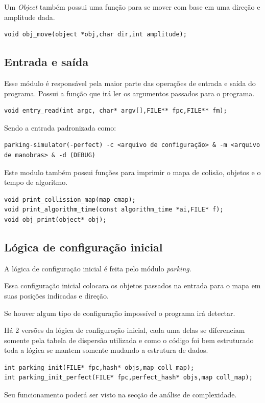 \documentclass[11pt]{article}
\begin{document}
Um \emph{Object} também possui uma função para se mover com base em uma direção e amplitude dada.

\begin{verbatim}
void obj_move(object *obj,char dir,int amplitude);
\end{verbatim}

\subsection{Entrada e saída}
\label{sec:orgd11f1c2}
Esse módulo é responsável pela maior parte das operações de entrada e saída do programa. Possui a função que irá ler os argumentos passados para o programa.
\begin{verbatim}
void entry_read(int argc, char* argv[],FILE** fpc,FILE** fm);
\end{verbatim}
Sendo a entrada padronizada como:
\begin{verbatim}
parking-simulator(-perfect) -c <arquivo de configuração> & -m <arquivo de manobras> & -d (DEBUG)
\end{verbatim}
Este modulo também possui funções para imprimir o mapa de colisão, objetos e o tempo de algoritmo.
\begin{verbatim}
void print_collission_map(map cmap);
void print_algorithm_time(const algorithm_time *ai,FILE* f);
void obj_print(object* obj);
\end{verbatim}
\subsection{Lógica de configuração inicial}
\label{sec:orgaeceb66}
A lógica de configuração inicial é feita pelo módulo \emph{parking}.

Essa configuração inicial colocara os objetos passados na entrada para o mapa em suas posições indicadas e direção.

Se houver algum tipo de configuração impossível o programa irá detectar.

Há 2 versões da lógica de configuração inicial, cada uma delas se diferenciam somente pela tabela de dispersão utilizada e como o código foi bem estruturado toda a lógica se mantem somente mudando a estrutura de dados.

\begin{verbatim}
int parking_init(FILE* fpc,hash* objs,map coll_map);
int parking_init_perfect(FILE* fpc,perfect_hash* objs,map coll_map);
\end{verbatim}
Seu funcionamento poderá ser visto na secção de análise de complexidade.
\end{document}

